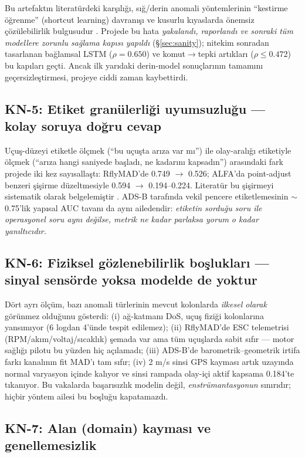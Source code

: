 \documentclass[11pt,a4paper]{article}
\begin{document}
Bu artefaktın literatürdeki karşılığı, sığ/derin anomali yöntemlerinin
``kestirme öğrenme'' (shortcut learning) davranışı ve kusurlu kıyaslarda
önemsiz çözülebilirlik bulgusudur \cite{wu2021flawed,ruff2021unifying}.
Projede bu hata \emph{yakalandı, raporlandı ve sonraki tüm modellere zorunlu
sağlama kapısı yapıldı} (\S\ref{sec:sanity}); nitekim sonradan tasarlanan
bağlamsal LSTM ($\rho = 0.650$) ve komut$\to$tepki artıkları ($\rho \leq
0.472$) bu kapıları geçti. Ancak ilk yarıdaki derin-model sonuçlarının
tamamını geçersizleştirmesi, projeye ciddi zaman kaybettirdi.

\subsection{KN-5: Etiket granülerliği uyumsuzluğu --- kolay soruya doğru cevap}

Uçuş-düzeyi etiketle ölçmek (``bu uçuşta arıza var mı'') ile olay-aralığı
etiketiyle ölçmek (``arıza hangi saniyede başladı, ne kadarını kapsadın'')
arasındaki fark projede iki kez sayısallaştı: RflyMAD'de 0.749 $\to$ 0.526;
ALFA'da point-adjust benzeri şişirme düzeltmesiyle 0.594 $\to$ 0.194--0.224.
Literatür bu şişirmeyi sistematik olarak belgelemiştir \cite{kim2022rigorous}.
ADS-B tarafında vekil pencere etiketlemesinin $\sim$0.75'lik yapısal AUC tavanı
da aynı ailedendir: \emph{etiketin sorduğu soru ile operasyonel soru aynı
değilse, metrik ne kadar parlaksa yorum o kadar yanıltıcıdır.}

\subsection{KN-6: Fiziksel gözlenebilirlik boşlukları --- sinyal sensörde yoksa
modelde de yoktur}

Dört ayrı ölçüm, bazı anomali türlerinin mevcut kolonlarda \emph{ilkesel
olarak} görünmez olduğunu gösterdi: (i) ağ-katmanı DoS, uçuş fiziği kolonlarına
yansımıyor (6 logdan 4'ünde tespit edilemez); (ii) RflyMAD'de ESC telemetrisi
(RPM/akım/voltaj/sıcaklık) şemada var ama tüm uçuşlarda sabit sıfır --- motor
sağlığı pilotu bu yüzden hiç açılamadı; (iii) ADS-B'de barometrik--geometrik
irtifa farkı kanalının fit MAD'ı tam sıfır; (iv) 2 m/s sinsi GPS kayması artık
uzayında normal varyasyon içinde kalıyor ve sinsi rampada olay-içi aktif
kapsama 0.184'te tıkanıyor. Bu vakalarda başarısızlık modelin değil,
\emph{enstrümantasyonun} sınırıdır; hiçbir yöntem ailesi bu boşluğu
kapatamazdı.

\subsection{KN-7: Alan (domain) kayması ve genellemesizlik}
\label{sec:kn-domain}
\end{document}
